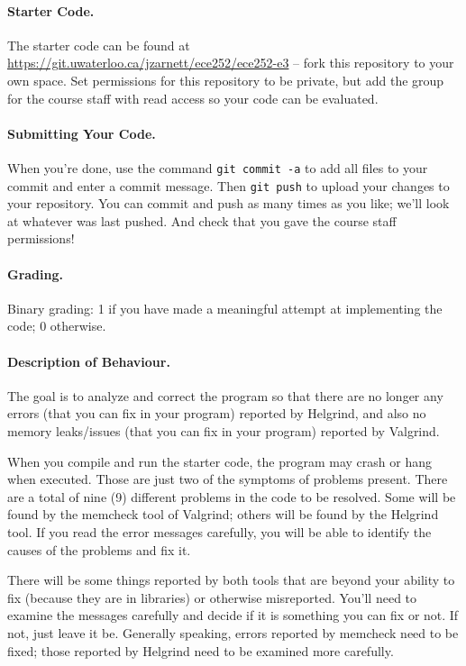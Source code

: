\paragraph{Starter Code.} The starter code can be found at \url{https://git.uwaterloo.ca/jzarnett/ece252/ece252-e3} -- fork this repository to your own space. Set permissions for this repository to be private, but add the group for the course staff with read access so your code can be evaluated.

\paragraph{Submitting Your Code.} When you're done, use the command \texttt{git commit -a} to add all files to your commit and enter a commit message. Then \texttt{git push} to upload your changes to your repository. You can commit and push as many times as you like; we'll look at whatever was last pushed. And check that you gave the course staff permissions!

\paragraph{Grading.} Binary grading: 1 if you have made a meaningful attempt at implementing the code; 0 otherwise.

\paragraph{Description of Behaviour.} The goal is to analyze and correct the program so that there are no longer any errors (that you can fix in your program) reported by Helgrind, and also no memory leaks/issues (that you can fix in your program) reported by Valgrind.

When you compile and run the starter code, the program may crash or hang when executed. Those are just two of the symptoms of problems present. There are a total of nine (9) different problems in the code to be resolved. Some will be found by the memcheck tool of Valgrind; others will be found by the Helgrind tool. If you read the error messages carefully, you will be able to identify the causes of the problems and fix it.

There will be some things reported by both tools that are beyond your ability to fix (because they are in libraries) or otherwise misreported. You'll need to examine the messages carefully and decide if it is something you can fix or not. If not, just leave it be. Generally speaking, errors reported by memcheck need to be fixed; those reported by Helgrind need to be examined more carefully.

